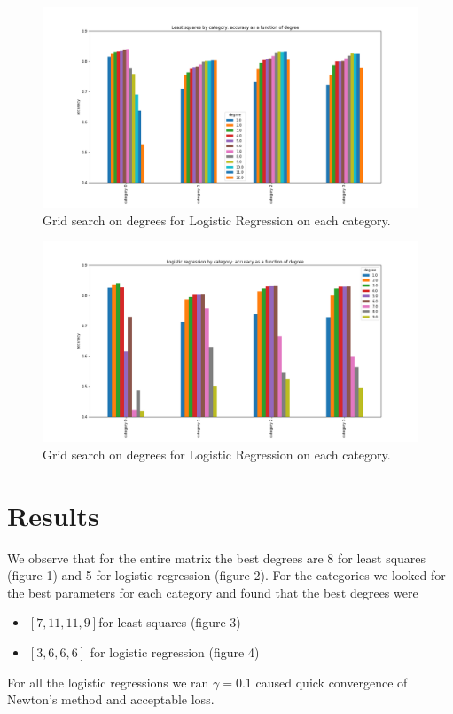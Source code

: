 \documentclass[10pt,conference,compsocconf]{IEEEtran}
\begin{document}
\begin{figure}[tbp]
  \centering
  \includegraphics[width=\columnwidth]{ls_cat_deg}
  \caption{Grid search on degrees for Logistic Regression on each category.}
  \vspace{-3mm}
  \label{fig:denoise-fourier}
\end{figure}
\begin{figure}[tbp]
  \centering
  \includegraphics[width=\columnwidth]{lr_cat_deg}
  \caption{Grid search on degrees for Logistic Regression on each category.}
  \vspace{-3mm}
  \label{fig:denoise-fourier}
\end{figure}
\section{Results}

We observe that for the entire matrix the best degrees are 8 for least squares (figure 1) and 5 for logistic regression (figure 2). For the categories we looked for the best parameters for each category and found that the best degrees were
\begin{itemize}
	\item $[7, 11, 11, 9]  $for least squares (figure 3)
	\item $[3, 6, 6, 6] $ for logistic regression (figure 4)
\end{itemize}
For all the logistic regressions we ran $\gamma = 0.1$ caused quick convergence of Newton's method
and acceptable loss.
\end{document}
